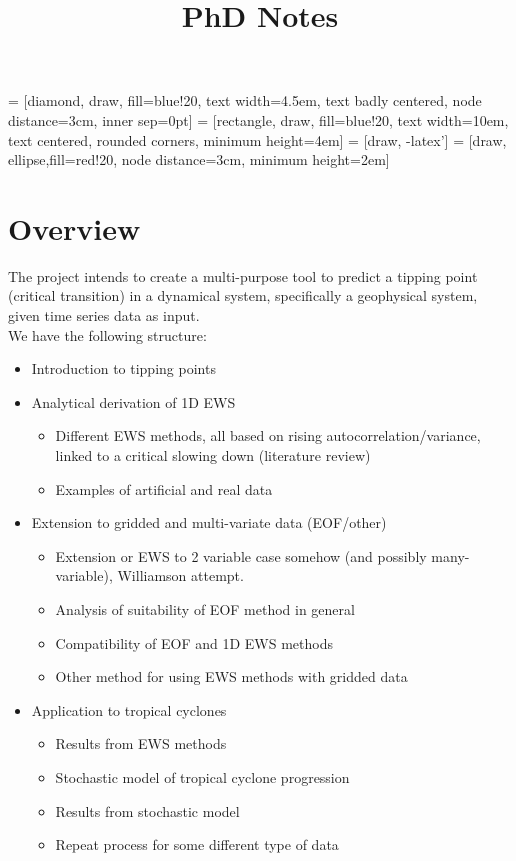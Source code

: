 \documentclass[11pt,a4paper,reqno]{article}
\numberwithin{equation}{section}
\begin{document}


\title{PhD Notes}
\maketitle

 = [diamond, draw, fill=blue!20, 
    text width=4.5em, text badly centered, node distance=3cm, inner sep=0pt]
 = [rectangle, draw, fill=blue!20, 
    text width=10em, text centered, rounded corners, minimum height=4em]
 = [draw, -latex']
 = [draw, ellipse,fill=red!20, node distance=3cm,
    minimum height=2em]
    
\section*{Overview}

The project intends to create a multi-purpose tool to predict a tipping point (critical transition) in a dynamical system, specifically a geophysical system, given time series data as input.\\

We have the following structure:
\begin{itemize}
\item[\ref{sec_tippingpoints}.] Introduction to tipping points
\item[\ref{sec_EWS_methods}.] Analytical derivation of 1D EWS 
\begin{itemize}
\item Different EWS methods, all based on rising autocorrelation/variance, linked to a critical slowing down (literature review)
\item Examples of artificial and real data
\end{itemize}
\item[\ref{sec_gridded}.] Extension to gridded and multi-variate data (EOF/other)
\begin{itemize}
\item Extension or EWS to 2 variable case somehow (and possibly many-variable), Williamson attempt.
\item Analysis of suitability of EOF method in general
\item Compatibility of EOF and 1D EWS methods
\item Other method for using EWS methods with gridded data
\end{itemize}
\item[\ref{sec_hurricanes}.] Application to tropical cyclones
\begin{itemize}
\item Results from EWS methods
\item Stochastic model of tropical cyclone progression
\item Results from stochastic model
\item Repeat process for some different type of data
\end{itemize}
\end{itemize}
\end{document}
